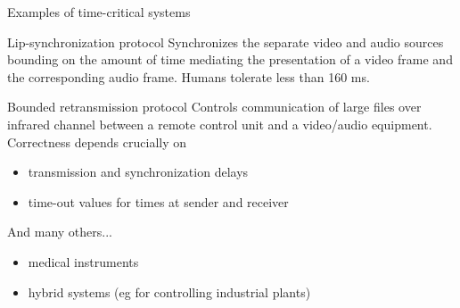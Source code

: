 \documentclass[aspectratio=169]{beamer}
\begin{document}
\begin{slide}{Examples of time-critical systems}
\small
\begin{block}{Lip-synchronization protocol}
Synchronizes the separate video and audio sources bounding on
the amount of time mediating the presentation of a video frame and the corresponding audio frame. Humans tolerate
 less than 160 ms.
\end{block}

\begin{block}{Bounded retransmission  protocol}
Controls communication of large files over infrared channel between a remote control unit and a 
video/audio equipment. Correctness depends crucially on  
\begin{itemize}
\item transmission and synchronization delays
\item time-out values for times at sender and receiver
\end{itemize}
\end{block}

\begin{block}{And many others...}
\begin{itemize}
\item medical instruments
\item hybrid systems (eg for controlling industrial plants)
\end{itemize}
\end{block}
\end{slide}


\end{document}
